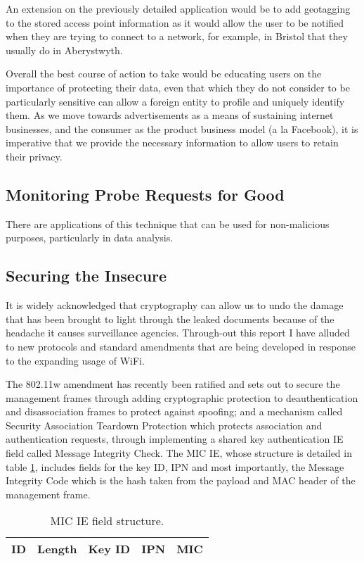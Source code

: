 An extension on the previously detailed application would be to add geotagging to the stored access point information as it would allow the user to be notified when they are trying to connect to a network, for example, in Bristol that they usually do in Aberystwyth.

Overall the best course of action to take would be educating users on the importance of protecting their data, even that which they do not consider to be particularly sensitive can allow a foreign entity to profile and uniquely identify them. As we move towards advertisements as a means of sustaining internet businesses, and the consumer as the product business model (a la Facebook), it is imperative that we provide the necessary information to allow users to retain their privacy. 
\newpage
\subsection{Monitoring Probe Requests for Good}
\label{conclusion:for-good}
There are applications of this technique that can be used for non-malicious purposes, particularly in data analysis.

\subsection{Securing the Insecure}
\label{80211w}
It is widely acknowledged that cryptography can allow us to undo the damage that has been brought to light through the leaked documents because of the headache it causes surveillance agencies. Through-out this report I have alluded to new protocols and standard amendments that are being developed in response to the expanding usage of WiFi. 

The 802.11w amendment has recently been ratified and sets out to secure the management frames through adding cryptographic protection to deauthentication and disassociation frames to protect against spoofing; and a mechanism called Security Association Teardown Protection which protects association and authentication requests, through implementing a shared key authentication IE field called  Message Integrity Check. The MIC IE, whose structure is detailed in table \ref{tbl:mic}, includes fields for the key ID, IPN and most importantly, the Message Integrity Code which is the hash taken from the payload and MAC header of the management frame. 

\begin{table}[h!]
\begin{center}
	\begin{tabular}{|  p{2cm} |  p{2cm} | p{2cm} | p{2cm} | p{2cm} |}
		\hline
		ID & Length & Key ID & IPN & MIC\\ 
		\hline
	\end{tabular}
\end{center}
\caption{MIC IE field structure.}
\label{tbl:mic}
\end{table}


